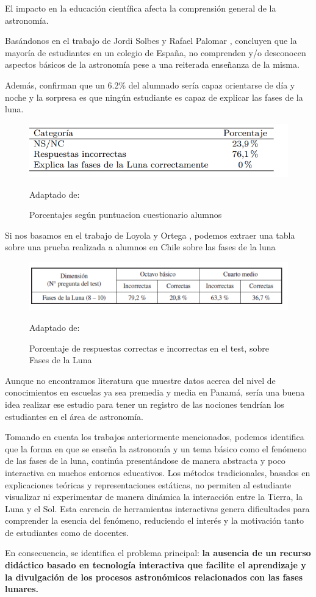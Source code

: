 El impacto en la educación científica afecta la comprensión general de la astronomía.

Basándonos en el trabajo de Jordi Solbes y Rafael Palomar \cite{aprendizajeEscuelas}, concluyen que la mayoría de estudiantes en un colegio de España,
no comprenden y/o desconocen aspectos básicos de la astronomía pese a una reiterada enseñanza de la misma.

Además, confirman que un 6.2\% del alumnado sería capaz orientarse de día y noche y la sorpresa es que ningún estudiante es capaz de explicar las 
fases de la luna.

\begin{figure}[H]
    \includegraphics[scale = 0.95]{Imagenes/EspanaPrueba.png}
    \centering
    \caption{Porcentajes según puntuacion cuestionario alumnos}{Adaptado de: \cite{aprendizajeEscuelas}}
\end{figure}

Si nos basamos en el trabajo de Loyola y Ortega \cite{rabanales2021}, podemos extraer una tabla sobre una prueba realizada a alumnos en Chile sobre las fases de la luna

\begin{figure}[H]
    \includegraphics[scale = 0.95]{Imagenes/tablaPruebaFases.png}
    \centering
    \caption{Porcentaje de respuestas correctas e
     incorrectas en el test, sobre Fases de la Luna}{Adaptado de: \cite{rabanales2021}}
\end{figure}

Aunque no encontramos literatura que muestre datos acerca del nivel de conocimientos
en escuelas ya sea premedia y media en Panamá, sería una buena idea realizar ese estudio para tener un registro
de las nociones tendrían los estudiantes en el área de astronomía. 

Tomando en cuenta los trabajos anteriormente mencionados, podemos identifica que la forma en que se enseña la astronomía y un tema básico como el fenómeno de las fases de la luna, continúa presentándose de manera abstracta y poco
interactiva en muchos entornos educativos. Los métodos tradicionales, basados en explicaciones teóricas y representaciones estáticas, no permiten al estudiante visualizar
ni experimentar de manera dinámica la interacción entre la Tierra, la Luna y el Sol. Esta carencia de herramientas interactivas genera dificultades para comprender la esencia 
del fenómeno, reduciendo el interés y la motivación tanto de estudiantes como de docentes. 

En consecuencia, se identifica el problema principal: \textbf{la ausencia de un recurso didáctico 
basado en tecnología interactiva que facilite el aprendizaje y la divulgación de los procesos astronómicos relacionados con las fases lunares.}